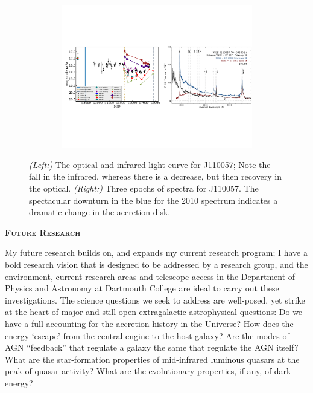 \documentclass[oneside, a4paper, onecolumn, 11pt]{article}
\begin{document}
\begin{figure}[h]
  \begin{center}
    \hspace{-0.5cm}
    \includegraphics[height=6.25cm,width=17.2cm]
    {figures/J110057_LC_Spectra_20171024.pdf}
    \vspace{-10pt}
    \caption{%
      \footnotesize 
      {\it (Left:)} The optical and infrared light-curve for J110057; 
      Note the fall in the infrared, whereas there is a decrease, but 
      then recovery in the optical. 
      {\it (Right:)} 
      Three epochs of spectra for J110057. 
      The spectacular downturn in the blue for the 2010 spectrum 
      indicates a dramatic change in the accretion disk.
    }
  \vspace{-16pt}
 \label{fig:J110057}
\end{center}
\end{figure}

\medskip\medskip
\noindent
{\bfseries \large \textsc{\textcolor{Cerulean}{Future Research}}}

\smallskip
\smallskip
\noindent
My future research builds on, and expands my current research program;
I have a bold research vision that is designed to be addressed by a
research group, and the environment, current research areas and
telescope access in the Department of Physics and Astronomy at Dartmouth College
are ideal to
carry out these investigations.
The science questions we seek to address are well-posed, yet strike at
the heart of major and still open extragalactic astrophysical
questions: Do we have a full accounting for the accretion history in
the Universe?  How does the energy `escape' from the central engine to
the host galaxy?  Are the modes of AGN ``feedback'' that regulate a
galaxy the same that regulate the AGN itself?  What are the
star-formation properties of mid-infrared luminous quasars at the peak
of quasar activity?  What are the evolutionary properties, if any, of
dark energy?
\end{document}
